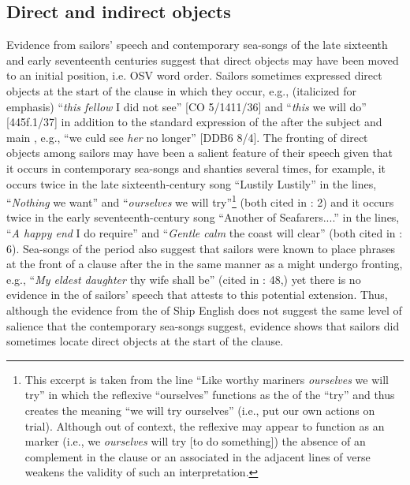 \subsection{{Direct and indirect objects} }%

Evidence from sailors’ speech and contemporary sea-songs of the late sixteenth and early seventeenth centuries suggest that direct objects may have been moved to an initial position, i.e. OSV word order. Sailors sometimes expressed direct objects at the start of the clause in which they occur, e.g., (italicized for emphasis) “\textit{this fellow} I did not see” [CO 5/1411/36] and “\textit{this} we will do” [445f.1/37] in addition to the standard expression of the  after the subject and main , e.g., “we culd see \textit{her} no longer” [DDB6 8/4]. The fronting of direct objects among sailors may have been a salient feature of their speech given that it occurs in contemporary sea-songs and shanties several times, for example, it occurs twice in the late sixteenth-century song “Lustily Lustily” in the lines, “\textit{Nothing} we want” and “\textit{ourselves} we will try”\footnote{This excerpt is taken from the line “Like worthy mariners \textit{ourselves} we will try” in which the reflexive “ourselves” functions as the  of the  “try” and thus creates the meaning “we will try ourselves” (i.e., put our own actions on trial). Although out of context, the reflexive may appear to function as an  marker (i.e., we \textit{ourselves} will try [to do something]) the absence of an  complement in the clause or an associated  in the adjacent lines of verse weakens the validity of such an interpretation.}  (both cited in \citealt{Palmer1986}: 2) and it occurs twice in the early seventeenth-century song “Another of Seafarers....” in the lines,  “\textit{A happy end} I do require” and “\textit{Gentle calm} the coast will clear” (both cited in \citealt{Palmer1986}: 6). Sea-songs of the period also suggest that sailors were known to place  phrases at the front of a clause after the  in the same manner as a  might undergo fronting, e.g., “\textit{My eldest daughter} thy wife shall be” (cited in \citealt{Palmer1986}: 48,) yet there is no evidence in the  of sailors’ speech that attests to this potential extension. Thus, although the evidence from the  of Ship English does not suggest the same level of salience that the contemporary sea-songs suggest, evidence shows that sailors did sometimes locate direct objects at the start of the clause. 

